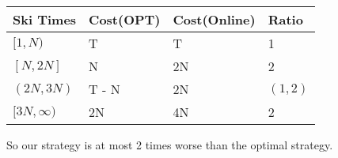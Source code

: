\begin{center}
\begin{tabular}{|l|l|l|l|}
  \hline
  Ski Times & Cost(OPT) & Cost(Online) & Ratio \\
  \hline
  $[1, N)$ & T & T & 1 \\
  \hline
  $[N, 2N]$ & N & 2N & 2 \\
  \hline
  $(2N, 3N)$ & T - N & 2N & $(1, 2)$ \\
  \hline
  $[3N, \infty)$ & 2N & 4N & 2 \\
  \hline
\end{tabular}
\end{center}

\noindent
So our strategy is at most 2 times worse than the optimal strategy.